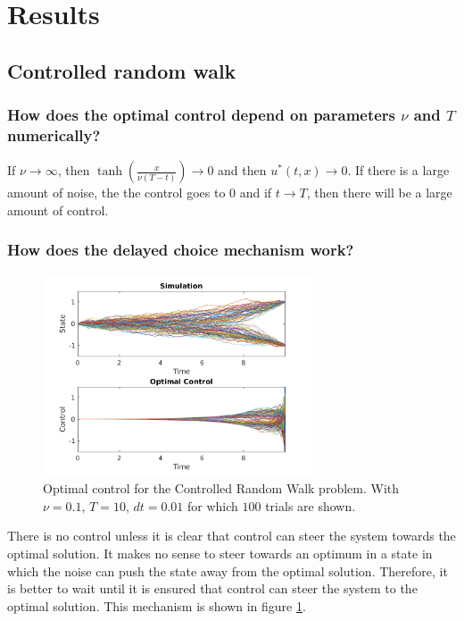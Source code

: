 \documentclass[10pt,a4paper]{article}
\begin{document}
\section{Results}
\subsection{Controlled random walk}
\subsubsection{How does the optimal control depend on parameters $\nu$ and $T$ numerically?}
If $\nu \rightarrow \infty$, then $\tanh(\frac{x}{\nu (T - t)}) \rightarrow 0$ and then $u^{*}(t,x) \rightarrow 0$. If there is a large amount of noise, the the control goes to $0$ and if $t \rightarrow T$, then there will be a large amount of control.

\subsubsection{How does the delayed choice mechanism work?}

\begin{figure}
\centering
\includegraphics[width=300px]{crw-oc-1.png}
\caption{Optimal control for the Controlled Random Walk problem. With $\nu=0.1$, $T=10$, $dt=0.01$ for which $100$ trials are shown.}
\label{fig:crw-oc-1}
\end{figure}

There is no control unless it is clear that control can steer the system towards the optimal solution. It makes no sense to steer towards an optimum in a state in which the noise can push the state away from the optimal solution. Therefore, it is better to wait until it is ensured that control can steer the system to the optimal solution. This mechanism is shown in figure \ref{fig:crw-oc-1}.
\end{document}
